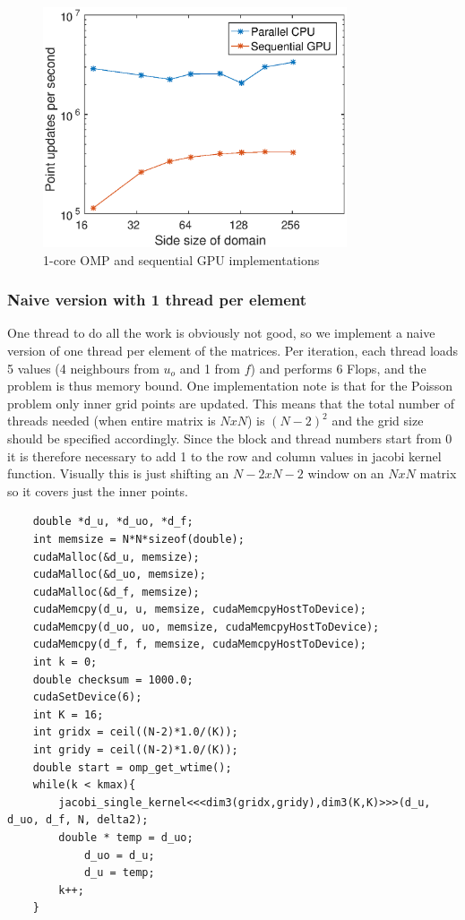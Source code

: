 \begin{figure}
\centering
\includegraphics[width = 0.8\textwidth]{fig/gpuseq.eps}
\caption{1-core OMP and sequential GPU implementations}
\label{fig:poisson_seq}
\end{figure}


\subsubsection{Naive version with 1 thread per element}
One thread to do all the work is obviously not good, so we implement a naive version of one thread per element of the matrices. Per iteration, each thread loads 5 values (4 neighbours from $u_o$ and 1 from $f$) and performs 6 Flops, and the problem is thus memory bound. One implementation note is that for the Poisson problem only inner grid points are updated. This means that the total number of threads needed (when entire matrix is $N x N$) is $(N-2)^2$ and the grid size should be specified accordingly. Since the block and thread numbers start from 0 it is therefore necessary to add 1 to the row and column values in jacobi kernel function. Visually this is just shifting an $N-2 x N-2$ window on an $N x N$ matrix so it covers just the inner points.  

\begin{lstlisting}
	double *d_u, *d_uo, *d_f;
	int memsize = N*N*sizeof(double);
	cudaMalloc(&d_u, memsize);
	cudaMalloc(&d_uo, memsize);
	cudaMalloc(&d_f, memsize);	
	cudaMemcpy(d_u, u, memsize, cudaMemcpyHostToDevice);
	cudaMemcpy(d_uo, uo, memsize, cudaMemcpyHostToDevice);
	cudaMemcpy(d_f, f, memsize, cudaMemcpyHostToDevice);
	int k = 0;
	double checksum = 1000.0;	
	cudaSetDevice(6);
	int K = 16;
	int gridx = ceil((N-2)*1.0/(K));
	int gridy = ceil((N-2)*1.0/(K));
	double start = omp_get_wtime(); 
	while(k < kmax){
		jacobi_single_kernel<<<dim3(gridx,gridy),dim3(K,K)>>>(d_u, d_uo, d_f, N, delta2);
		double * temp = d_uo;
    		d_uo = d_u;
    		d_u = temp;
		k++;
	}
\end{lstlisting}

